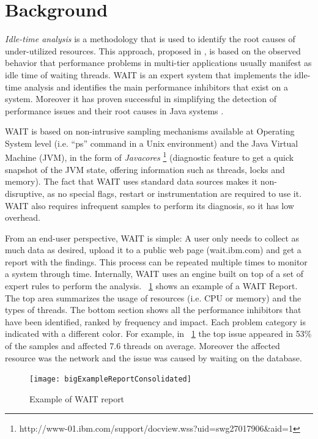 \documentclass[runningheads,a4paper]{llncs}
\newcommand{\myspaceM}{-7.6pt}
\begin{document}
\section{Background}
\label{Background}
\vspace{\myspaceM{}}
\emph{Idle-time analysis} is a methodology that is used to identify the root
causes of under-utilized resources. This approach, proposed in
\cite{Altman2010}, is based on the observed behavior that performance problems in multi-tier
applications usually manifest as idle time of waiting threads.
WAIT is an expert system that implements the idle-time analysis and identifies
the main performance inhibitors that exist on a system. Moreover it has proven successful 
in simplifying the detection of performance issues and their root causes in Java
systems \cite{Altman2010,Wu1}.

WAIT is based on non-intrusive sampling mechanisms available at
Operating System level (i.e. ``ps'' command in a Unix environment) and the Java
Virtual Machine (JVM), in the form of \emph{Javacores}
\footnote{http://www-01.ibm.com/support/docview.wss?uid=swg27017906\&aid=1}
(diagnostic feature to get a quick snapshot of the JVM state, offering
information such as threads, locks and memory). The fact that WAIT uses standard
data sources makes it non-disruptive, as no special flags, restart
or instrumentation are required to use it. WAIT also requires infrequent
samples to perform its diagnosis, so it has low overhead.

From an end-user perspective, WAIT is simple: A user only needs to
collect as much data as desired, upload it to a public web page (wait.ibm.com)
and get a report with the findings. This process can be repeated multiple times to monitor a
system through time. Internally, WAIT uses an engine built on top of a set of 
expert rules to perform the analysis. \figurename ~\ref{fig_WAITReport} shows an
example of a WAIT Report. The top area summarizes the usage of resources (i.e.
CPU or memory) and the types of threads. The bottom section shows all
the performance inhibitors that have been identified, ranked by frequency and impact. 
Each problem category is indicated with a different color. For example, in
\figurename ~\ref{fig_WAITReport} the top issue appeared in 53\% of the samples and 
affected 7.6 threads on average. Moreover the affected resource was the
network and the issue was caused by waiting on the database.

\begin{figure}[!h]
\centering
\texttt{[image: bigExampleReportConsolidated]}
\caption{Example of WAIT report}
\label{fig_WAITReport}
\end{figure}
\end{document}
